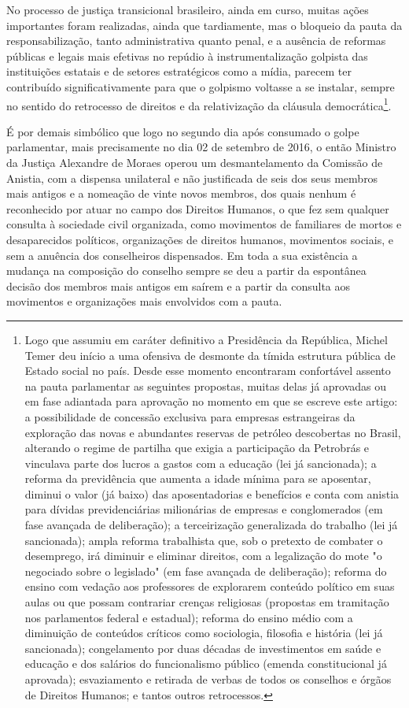 No processo de justiça transicional brasileiro, ainda em curso, muitas
ações importantes foram realizadas, ainda que tardiamente, mas o
bloqueio da pauta da responsabilização, tanto administrativa quanto
penal, e a ausência de reformas públicas e legais mais efetivas no
repúdio à instrumentalização golpista das instituições estatais e de
setores estratégicos como a mídia, parecem ter contribuído
significativamente para que o golpismo voltasse a se instalar, sempre no
sentido do retrocesso de direitos e da relativização da cláusula
democrática\footnote{Logo que assumiu em caráter definitivo a
  Presidência da República, Michel Temer deu início a uma ofensiva de
  desmonte da tímida estrutura pública de Estado social no país. Desde
  esse momento encontraram confortável assento na pauta parlamentar as
  seguintes propostas, muitas delas já aprovadas ou em fase adiantada
  para aprovação no momento em que se escreve este artigo: a
  possibilidade de concessão exclusiva para empresas estrangeiras da
  exploração das novas e abundantes reservas de petróleo descobertas no
  Brasil, alterando o regime de partilha que exigia a participação da
  Petrobrás e vinculava parte dos lucros a gastos com a educação (lei já
  sancionada); a reforma da previdência que aumenta a idade mínima para
  se aposentar, diminui o valor (já baixo) das aposentadorias e
  benefícios e conta com anistia para dívidas previdenciárias
  milionárias de empresas e conglomerados (em fase avançada de
  deliberação); a terceirização generalizada do trabalho (lei já
  sancionada); ampla reforma trabalhista que, sob o pretexto de combater
  o desemprego, irá diminuir e eliminar direitos, com a legalização do
  mote "o negociado sobre o legislado" (em fase avançada de
  deliberação); reforma do ensino com vedação aos professores de
  explorarem conteúdo político em suas aulas ou que possam contrariar
  crenças religiosas (propostas em tramitação nos parlamentos federal e
  estadual); reforma do ensino médio com a diminuição de conteúdos
  críticos como sociologia, filosofia e história (lei já sancionada);
  congelamento por duas décadas de investimentos em saúde e educação e
  dos salários do funcionalismo público (emenda constitucional já
  aprovada); esvaziamento e retirada de verbas de todos os conselhos e
  órgãos de Direitos Humanos; e tantos outros retrocessos.}.

É por demais simbólico que logo no segundo dia após consumado o golpe
parlamentar, mais precisamente no dia 02 de setembro de 2016, o então
Ministro da Justiça Alexandre de Moraes operou um desmantelamento da
Comissão de Anistia, com a dispensa unilateral e não justificada de seis
dos seus membros mais antigos e a nomeação de vinte novos membros, dos
quais nenhum é reconhecido por atuar no campo dos Direitos Humanos, o
que fez sem qualquer consulta à sociedade civil organizada, como
movimentos de familiares de mortos e desaparecidos políticos,
organizações de direitos humanos, movimentos sociais, e sem a anuência
dos conselheiros dispensados. Em toda a sua existência a mudança na
composição do conselho sempre se deu a partir da espontânea decisão dos
membros mais antigos em saírem e a partir da consulta aos movimentos e
organizações mais envolvidos com a pauta.


